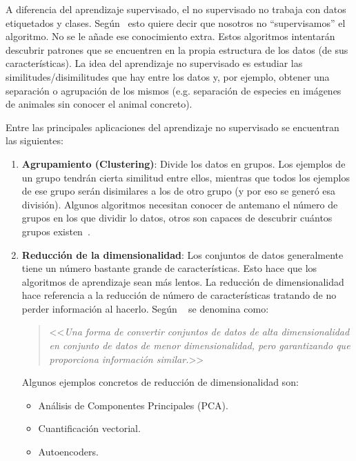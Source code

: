 A diferencia del aprendizaje supervisado, el no supervisado no trabaja con datos etiquetados y clases. Según~\cite{salim:usl} esto quiere decir que nosotros no ``supervisamos'' el algoritmo. No se le añade ese conocimiento extra. Estos algoritmos intentarán descubrir patrones que se encuentren en la propia estructura de los datos (de sus características). La idea del aprendizaje no supervisado es estudiar las similitudes/disimilitudes que hay entre los datos y, por ejemplo, obtener una separación o agrupación de los mismos (e.g. separación de especies en imágenes de animales sin conocer el animal concreto).
 
Entre las principales aplicaciones del aprendizaje no supervisado se encuentran las siguientes:
\vspace{-4px}
\begin{enumerate}
    \item \textbf{Agrupamiento (Clustering)}: Divide los datos en grupos. Los ejemplos de un grupo tendrán cierta similitud entre ellos, mientras que todos los ejemplos de ese grupo serán disimilares a los de otro grupo (y por eso se generó esa división). Algunos algoritmos necesitan conocer de antemano el número de grupos en los que dividir lo datos, otros son capaces de descubrir cuántos grupos existen~\cite{salim:usl}.
    \item \textbf{Reducción de la dimensionalidad}: Los conjuntos de datos generalmente tiene un número bastante grande de características. Esto hace que los algoritmos de aprendizaje sean más lentos. La reducción de dimensionalidad hace referencia a la reducción de número de características tratando de no perder información al hacerlo.
    Según
   ~\cite{javatpoint:reduccionsdims} se denomina
    como: \begin{quote}<<\textit{Una forma de convertir conjuntos de datos de alta dimensionalidad en
    conjunto de datos de menor dimensionalidad, pero garantizando que proporciona
    información similar.}>>\end{quote} 
    
    Algunos ejemplos concretos de reducción de dimensionalidad son:
    \begin{itemize}
        \item Análisis de Componentes Principales (PCA).
        \item Cuantificación vectorial.
        \item Autoencoders.
    \end{itemize}
\end{enumerate}

